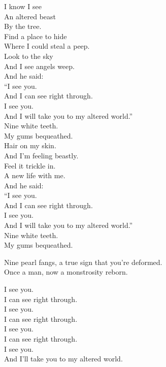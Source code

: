 
I know I see \\
An altered beast \\
By the tree. \\

Find a place to hide \\
Where I could steal a peep. \\
Look to the sky \\
And I see angels weep. \\

And he said: \\
``I see you. \\
And I can see right through. \\
I see you. \\
And I will take you to my altered world.'' \\

Nine white teeth. \\
My gums bequeathed. \\

Hair on my skin. \\
And I'm feeling beastly. \\
Feel it trickle in. \\
A new life with me. \\

And he said: \\
``I see you. \\
And I can see right through. \\
I see you. \\
And I will take you to my altered world.'' \\

Nine white teeth. \\
My gums bequeathed. \\


Nine pearl fangs, a true sign that you're deformed. \\
Once a man, now a monstrosity reborn. \\


I see you. \\
I can see right through. \\
I see you. \\
I can see right through. \\
I see you. \\
I can see right through. \\
I see you. \\
And I'll take you to my altered world. \\

